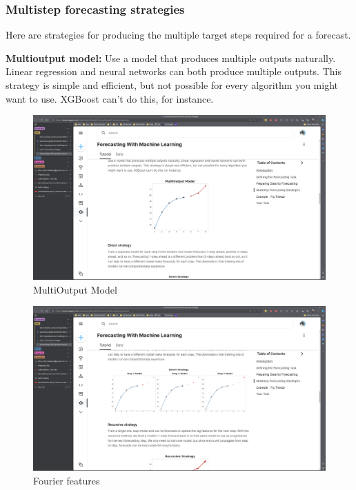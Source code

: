 \documentclass[12pt]{report}
\begin{document}
\subsubsection{Multistep forecasting strategies}
Here are strategies for producing the multiple target steps required for a forecast.


\textbf{Multioutput model:} Use a model that produces multiple outputs naturally. Linear regression and neural networks can both produce multiple outputs. This strategy is simple and efficient, but not possible for every algorithm you might want to use. XGBoost can't do this, for instance.

\begin{figure}[htbp]
  \begin{center}
    \includegraphics[trim =35cm 12.0cm 25cm 18cm, clip, scale=0.3]{pics/forecast1.png}
    \caption{MultiOutput Model}
    \label{default}
  \end{center}
\end{figure}

\begin{figure}[htbp]
  \begin{center}
    \includegraphics[trim =30cm 10.0cm 20cm 15cm, clip, scale=0.4]{pics/forecast2.png}
    \caption{Fourier features}
    \label{default}
  \end{center}
\end{figure}
\end{document}

